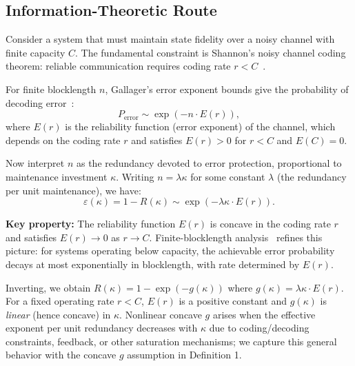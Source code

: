 \documentclass[11pt,twocolumn]{article}
\begin{document}
\subsection{Information-Theoretic Route}
\label{sec:shannon_route}

Consider a system that must maintain state fidelity over a noisy channel with finite capacity $C$. The fundamental constraint is Shannon's noisy channel coding theorem: reliable communication requires coding rate $r < C$~\cite{Shannon1948}.

For finite blocklength $n$, Gallager's error exponent bounds give the probability of decoding error~\cite{Gallager1965}:
\begin{equation}
P_{\mathrm{error}} \sim \exp(-n \cdot E(r)),
\label{eq:gallager}
\end{equation}
where $E(r)$ is the reliability function (error exponent) of the channel, which depends on the coding rate $r$ and satisfies $E(r) > 0$ for $r < C$ and $E(C) = 0$.

Now interpret $n$ as the redundancy devoted to error protection, proportional to maintenance investment $\kappa$. Writing $n = \lambda \kappa$ for some constant $\lambda$ (the redundancy per unit maintenance), we have:
\begin{equation}
\varepsilon(\kappa) = 1 - R(\kappa) \sim \exp(-\lambda \kappa \cdot E(r)).
\label{eq:error_kappa}
\end{equation}

\textbf{Key property:} The reliability function $E(r)$ is concave in the coding rate $r$ and satisfies $E(r) \to 0$ as $r \to C$. Finite-blocklength analysis~\cite{Polyanskiy2010} refines this picture: for systems operating below capacity, the achievable error probability decays at most exponentially in blocklength, with rate determined by $E(r)$.

Inverting, we obtain $R(\kappa) = 1 - \exp(-g(\kappa))$ where $g(\kappa) = \lambda \kappa \cdot E(r)$. For a fixed operating rate $r < C$, $E(r)$ is a positive constant and $g(\kappa)$ is \emph{linear} (hence concave) in $\kappa$. Nonlinear concave $g$ arises when the effective exponent per unit redundancy decreases with $\kappa$ due to coding/decoding constraints, feedback, or other saturation mechanisms; we capture this general behavior with the concave $g$ assumption in Definition 1.
\end{document}
